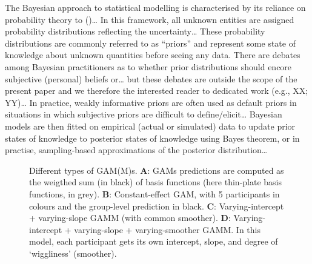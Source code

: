\documentclass[
  man,
  floatsintext,
  longtable,
  a4paper,
  nolmodern,
  notxfonts,
  notimes,
  colorlinks=true,linkcolor=blue,citecolor=blue,urlcolor=blue]{apa7}
\begin{document}
The Bayesian approach to statistical modelling is characterised by its
reliance on probability theory to ()\ldots{} In this framework, all unknown entities are assigned
probability distributions reflecting the uncertainty\ldots{} These
probability distributions are commonly referred to as ``priors'' and
represent some state of knowledge about unknown quantities before seeing
any data. There are debates among Bayesian practitioners as to whether
prior distributions should encore subjective (personal) beliefs
or\ldots{} but these debates are outside the scope of the present paper
and we therefore the interested reader to dedicated work (e.g., XX;
YY)\ldots{} In practice, weakly informative priors are often used as
default priors in situations in which subjective priors are difficult to
define/elicit\ldots{} Bayesian models are then fitted on empirical
(actual or simulated) data to update prior states of knowledge to
posterior states of knowledge using Bayes theorem, or in practise,
sampling-based approximations of the posterior distribution\ldots{}

\begin{figure}[!htb]

\caption{\label{fig-intro-gam}Different types of GAM(M)s. \textbf{A}:
GAMs predictions are computed as the weigthed sum (in black) of basis
functions (here thin-plate basis functions, in grey). \textbf{B}:
Constant-effect GAM, with 5 participants in colours and the group-level
prediction in black. \textbf{C}: Varying-intercept + varying-slope GAMM
(with common smoother). \textbf{D}: Varying-intercept + varying-slope +
varying-smoother GAMM. In this model, each participant gets its own
intercept, slope, and degree of `wiggliness' (smoother).}


\end{figure}%
\end{document}
